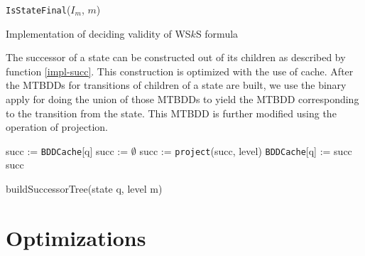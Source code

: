 \begin{algorithm}[h!]
		\BlankLine
		\nl\Return \texttt{IsStateFinal}($I_m$, $m$)\;
		\BlankLine
		\caption{Implementation of deciding validity of WS$k$S formula
		}\label{impl-main}
	\end{algorithm}
 
 The successor of a state can be constructed out of its children
 as described by function \ref{impl-succ}.
 This construction is optimized with the use of cache. After the MTBDDs for
 transitions of children of a state are built, we use the binary apply for doing
 the union of those MTBDDs to yield the MTBDD corresponding to the transition
 from the state. This MTBDD is further modified using the operation of
 projection.
 
\begin{function}[h!]
		\BlankLine
		\nl succ := \texttt{BDDCache}[q]\;
		\nl {}
		\nl succ := $\emptyset$\;
		\nl{}
		\nl succ := \texttt{project}(succ, level)\;
		\nl \texttt{BDDCache}[q] := succ\;
		\nl \Return succ\;
		\caption{buildSuccessorTree(state q, level m)}\label{impl-succ}
	\end{function}
 
 \section{Optimizations}
 
